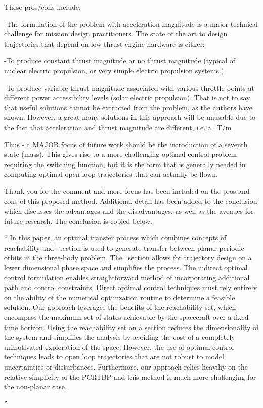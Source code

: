 \documentclass[11pt]{article}
\newenvironment{correction}{\begin{list}{}{\setlength{\leftmargin}{1cm}\setlength{\rightmargin}{1cm}}\vspace{\parsep}\item[]``}{''\end{list}}
\begin{document}
\begin{itemize}
\begin{itshape}
These pros/cons include:

-The formulation of the problem with acceleration magnitude is a major technical challenge for mission design practitioners.  The state of the art to design trajectories that depend on low-thrust engine hardware is either:

-To produce constant thrust magnitude or no thrust magnitude (typical of nuclear electric propulsion, or very simple electric propulsion systems.)

-To produce variable thrust magnitude associated with various throttle points at different power accessibility levels (solar electric propulsion).
That is not to say that useful solutions cannot be extracted from the problem, as the authors have shown.  However, a great many solutions in this approach will be unusable due to the fact that acceleration and thrust magnitude are different, i.e. a=T/m

Thus - a MAJOR focus of future work should be the introduction of a seventh state (mass).  This gives rise to a more challenging optimal control problem requiring the switching function, but it is the form that is generally needed in computing optimal open-loop trajectories that can actually be flown.
\end{itshape}

Thank you for the comment and more focus has been included on the pros and cons of this proposed method.
Additional detail has been added to the conclusion which discusses the advantages and the disadvantages, as well as the avenues for future research.
The conclusion is copied below.
\begin{correction}
In this paper, an optimal transfer process which combines concepts of reachability and \Poincare~section is used to generate transfer between planar periodic orbits in the three-body problem.
The \Poincare~section allows for trajectory design on a lower dimensional phase space and simplifies the process.
The indirect optimal control formulation enables straightforward method of incorporating additional path and control constraints.
Direct optimal control techniques must rely entirely on the ability of the numerical optimzation routine to determine a feasible solution.
Our approach leverages the benefits of the reachability set, which encompass the maximum set of states achievable by the spacecraft over a fixed time horizon.
Using the reachability set on a \Poincare section reduces the dimensionality of the system and simplifies the analysis by avoiding the cost of a completely unmotivated exploration of the space.
However, the use of optimal control techniques leads to open loop trajectories that are not robust to model uncertainties or disturbances.
Furthermore, our approach relies heaviliy on the relative simplicity of the PCRTBP and this method is much more challenging for the non-planar case.


\end{correction}
\end{itemize}
\end{document}
